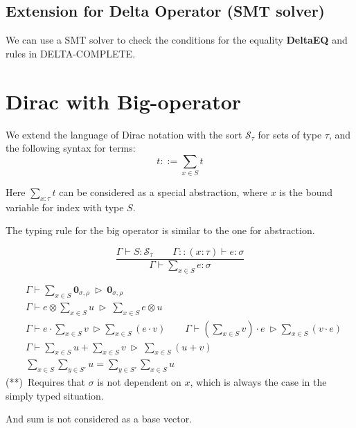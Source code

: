 \subsection{Extension for Delta Operator (SMT solver)}
We can use a SMT solver to check the conditions for the equality \textbf{DeltaEQ} and rules in \textsf{DELTA-COMPLETE}.





\section{Dirac with Big-operator}
We extend the language of Dirac notation with the sort $\mathcal{S}_\tau$ for sets of type $\tau$, and the following syntax for terms:
$$
t ::= \sum_{x \in S} t
$$

Here $\sum_{x : \tau} t$ can be considered as a special abstraction, where $x$ is the bound variable for index with type $S$.

\begin{definition}
  The typing rule for the big operator is similar to the one for abstraction.

  $$
  \frac{\Gamma \vdash S : \mathcal{S}_\tau\qquad \Gamma::(x : \tau) \vdash e : \sigma}{\Gamma \vdash \sum_{x \in S} e : \sigma}
  $$
  
\end{definition}

\begin{definition}
    \begin{align*}
        & \Gamma \vdash \sum_{x \in S} \mathbf{0}_{\sigma, \rho} \ \triangleright\ \mathbf{0}_{\sigma, \rho} \\
        & \Gamma \vdash e \otimes \sum_{x \in S} u \ \triangleright\ \sum_{x \in S} e \otimes u \\
        &\Gamma \vdash e\cdot \sum_{x \in S} v \ \triangleright \sum_{x \in S} (e\cdot v)
        \qquad 
        \Gamma \vdash (\sum_{x \in S} v) \cdot e\ \triangleright \sum_{x \in S} (v \cdot e)\\        
        & \Gamma \vdash \sum_{x \in S} u + \sum_{x \in S} v  \ \triangleright\ \sum_{x \in S} (u + v) \\
        \tag{**}
        & \sum_{x \in S} \sum_{y \in S'} u = \sum_{y \in S'} \sum_{x \in S} u
    \end{align*}
(**)\ Requires that $\sigma$ is not dependent on $x$, which is always the case in the simply typed situation.

And sum is not considered as a base vector.
\end{definition}

